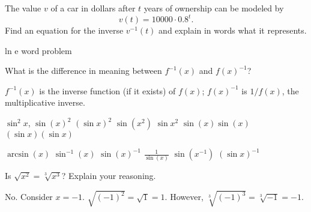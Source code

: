 \begin{exercises}
\begin{exercise}
The value $v$ of a car in dollars after $t$ years of ownership can be
modeled by
\[
v(t) = 10000\cdot 0.8^{t}.
\]
Find an equation for the inverse $v^{-1}(t)$ and explain in words
what it represents.
\end{exercise}



\begin{exercise}
ln e word problem
\end{exercise}



\begin{exercise}
What is the difference in meaning between $f^{-1}(x)$ and $f(x)^{-1}$?
\begin{answer}
$f^{-1}(x)$ is the inverse function (if it exists) of $f(x)$;
  $f(x)^{-1}$ is $1/f(x)$, the multiplicative inverse.
\end{answer}
\end{exercise}



\begin{exercise}
$\sin^2 x$, $\sin(x)^2$  $(\sin x)^2$ $\sin(x^2)$ $\sin x^2$ $\sin(x) \sin(x)$ $(\sin x)(\sin x)$
\end{exercise}

\begin{exercise}
$\arcsin(x)$ $\sin^{-1}(x)$ $\sin(x)^{-1}$ $\frac{1}{\sin(x)}$ $\sin(x^{-1})$  $(\sin x)^{-1}$
\end{exercise}

\begin{exercise} 
Is $\sqrt{x^2} = \sqrt[3]{x^3}$? Explain your reasoning.
\begin{answer}
No. Consider $x = -1$. $\sqrt{(-1)^2} = \sqrt{1} = 1$. However, $\sqrt[3]{(-1)^3} =  \sqrt[3]{-1} = -1$.  
\end{answer}
\end{exercise}



\end{exercises}
